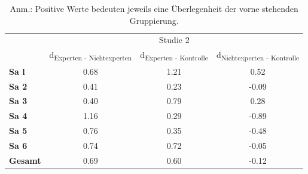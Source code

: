\documentclass[final]{beamer}
\newlength{\onecolwid}
\newlength{\twocolwid}
\begin{document}
\begin{frame}[t]
\begin{columns}[t]
\begin{column}{\twocolwid}
\begin{columns}[t,totalwidth=\twocolwid]
\begin{column}{\onecolwid}
\begin{table}
\begin{tabular}{lccc}
\toprule 
 & \multicolumn{3}{c}{Studie 2} \\
\cmidrule{2-4}
 & d\textsubscript{Experten - Nichtexperten} & d\textsubscript{Experten - Kontrolle} & d\textsubscript{Nichtexperten - Kontrolle} \\
\midrule 
\textbf{Sa l} & 0.68 & 1.21 & 0.52 \\
\textbf{Sa 2} & 0.41 & 0.23 & -0.09 \\
\textbf{Sa 3} & 0.40 & 0.79 & 0.28 \\
\textbf{Sa 4} & 1.16 & 0.29 & -0.89 \\
\textbf{Sa 5} & 0.76 & 0.35 & -0.48 \\
\textbf{Sa 6} & 0.74 & 0.72 & -0.05 \\
\midrule 
\textbf{Gesamt} & 0.69 & 0.60 & -0.12 \\
\bottomrule
\end{tabular}
{\caption*{Anm.: Positive Werte bedeuten jeweils eine Überlegenheit der vorne stehenden Gruppierung.}}
\end{table}


\end{column} %


\end{columns} %
\end{column} %
\end{columns} %
\end{frame} %
\end{document}
